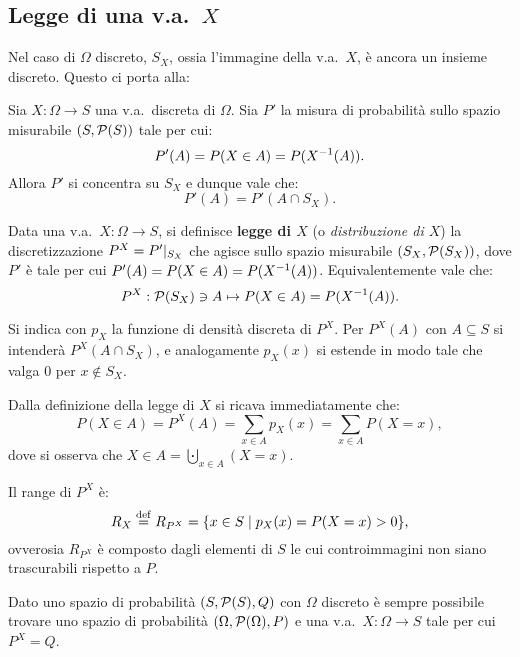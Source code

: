 \begin{multicols*}{2}
\subsection{Legge di una v.a.~\texorpdfstring{$X$}{X}}

Nel caso di $\Omega$ discreto, $S_X$, ossia l'immagine della v.a.~$X$, è
ancora un insieme discreto. Questo ci porta alla:

\begin{proposition}
    Sia $X : \Omega \to S$ una v.a.~discreta di $\Omega$.
    Sia $P'$ la misura di probabilità sullo spazio misurabile
    $(S, \mathcal{P}(S))$ tale per cui:
    \[
        P'(A) = P(X \in A) = P(X^{-1}(A)).
    \]
    Allora $P'$ si concentra su $S_X$ e dunque vale che:
    \[
        P'(A) = P'(A \cap S_X).
    \]
\end{proposition}
    
\begin{definition}[Legge di $X$]
    Data una v.a.~$X : \Omega \to S$, si definisce \textbf{legge di $X$} (o \textit{distribuzione
    di $X$}) la discretizzazione $P^X = P'\arrowvert_{S_X}$ che
    agisce sullo spazio misurabile $(S_X, \mathcal{P}(S_X))$, dove
    $P'$ è tale per cui $P'(A) = P(X \in A) = P(X^{-1}(A))$.
    Equivalentemente vale che:
    \[
        P^X : \mathcal{P}(S_X) \ni A \mapsto P(X \in A) = P(X^{-1}(A)).
    \]


    Si indica con $p_X$ la funzione di densità discreta di $P^X$.
    Per $P^X(A)$ con $A \subseteq S$ si intenderà
    $P^X(A \cap S_X)$, e analogamente $p_X(x)$ si estende in modo
    tale che valga $0$ per $x \notin S_X$.
\end{definition}

\begin{remark}
    Dalla definizione della legge di $X$ si ricava immediatamente che:
    \[
        P(X \in A) = P^X(A) = \sum_{x \in A} p_X(x) = \sum_{x \in A} P(X = x),
    \]
    dove si osserva che $X \in A = \bigcupdot_{x \in A} (X = x)$.
\end{remark}

\begin{remark}
    Il range di $P^X$ è:
    \[ R_X \overset{\mathrm{def}}{=} R_{P^X} = \{x \in S \mid p_X(x) = P(X = x) > 0\}, \]
    ovverosia $R_{P^X}$ è composto dagli elementi di $S$ le cui
    controimmagini non siano trascurabili rispetto a $P$.
\end{remark}

\begin{remark}
    Dato uno spazio di probabilità $(S, \mathcal{P}(S), Q)$ con
    $\Omega$ discreto è sempre possibile trovare uno
    spazio di probabilità $(\Omega, \mathcal{P}(\Omega), P)$ e una
    v.a.~$X : \Omega \to S$ tale per cui $P^X = Q$. \smallskip


\end{remark}
\end{multicols*}
